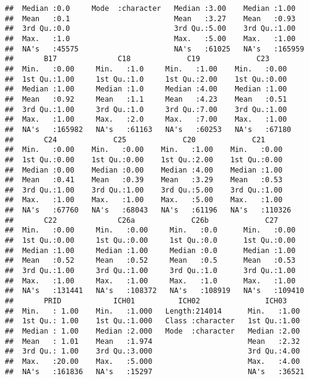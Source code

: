 \documentclass[
]{article}
\begin{document}
\begin{verbatim}
##  Median :0.0     Mode  :character   Median :3.00    Median :1.00    
##  Mean   :0.1                        Mean   :3.27    Mean   :0.93    
##  3rd Qu.:0.0                        3rd Qu.:5.00    3rd Qu.:1.00    
##  Max.   :1.0                        Max.   :5.00    Max.   :1.00    
##  NA's   :45575                      NA's   :61025   NA's   :165959  
##       B17              C18             C19             C23       
##  Min.   :0.00     Min.   :1.0     Min.   :1.00    Min.   :0.00   
##  1st Qu.:1.00     1st Qu.:1.0     1st Qu.:2.00    1st Qu.:0.00   
##  Median :1.00     Median :1.0     Median :4.00    Median :1.00   
##  Mean   :0.92     Mean   :1.1     Mean   :4.23    Mean   :0.51   
##  3rd Qu.:1.00     3rd Qu.:1.0     3rd Qu.:7.00    3rd Qu.:1.00   
##  Max.   :1.00     Max.   :2.0     Max.   :7.00    Max.   :1.00   
##  NA's   :165982   NA's   :61163   NA's   :60253   NA's   :67180  
##       C24             C25             C20             C21        
##  Min.   :0.00    Min.   :0.00    Min.   :1.00    Min.   :0.00    
##  1st Qu.:0.00    1st Qu.:0.00    1st Qu.:2.00    1st Qu.:0.00    
##  Median :0.00    Median :0.00    Median :4.00    Median :1.00    
##  Mean   :0.41    Mean   :0.39    Mean   :3.29    Mean   :0.53    
##  3rd Qu.:1.00    3rd Qu.:1.00    3rd Qu.:5.00    3rd Qu.:1.00    
##  Max.   :1.00    Max.   :1.00    Max.   :5.00    Max.   :1.00    
##  NA's   :67760   NA's   :68043   NA's   :61196   NA's   :110326  
##       C22              C26a             C26b             C27        
##  Min.   :0.00     Min.   :0.00     Min.   :0.0      Min.   :0.00    
##  1st Qu.:0.00     1st Qu.:0.00     1st Qu.:0.0      1st Qu.:0.00    
##  Median :1.00     Median :1.00     Median :0.0      Median :1.00    
##  Mean   :0.52     Mean   :0.52     Mean   :0.5      Mean   :0.53    
##  3rd Qu.:1.00     3rd Qu.:1.00     3rd Qu.:1.0      3rd Qu.:1.00    
##  Max.   :1.00     Max.   :1.00     Max.   :1.0      Max.   :1.00    
##  NA's   :131441   NA's   :108372   NA's   :108919   NA's   :109410  
##       PRID            ICH01          ICH02               ICH03      
##  Min.   : 1.00    Min.   :1.000   Length:214014      Min.   :1.00   
##  1st Qu.: 1.00    1st Qu.:1.000   Class :character   1st Qu.:1.00   
##  Median : 1.00    Median :2.000   Mode  :character   Median :2.00   
##  Mean   : 1.01    Mean   :1.974                      Mean   :2.32   
##  3rd Qu.: 1.00    3rd Qu.:3.000                      3rd Qu.:4.00   
##  Max.   :20.00    Max.   :5.000                      Max.   :4.00   
##  NA's   :161836   NA's   :15297                      NA's   :36521  

\end{verbatim}
\end{document}
